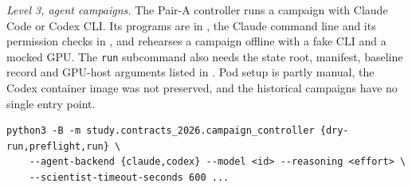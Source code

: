 \emph{Level 3, agent campaigns.} The Pair-A controller runs a campaign with Claude Code or Codex CLI. Its programs are in , the Claude command line and its permission checks in , and  rehearses a campaign offline with a fake CLI and a mocked GPU. The \texttt{run} subcommand also needs the state root, manifest, baseline record and GPU-host arguments listed in . Pod setup is partly manual, the Codex container image was not preserved, and the historical campaigns have no single entry point.
\begingroup\footnotesize
\begin{verbatim}
python3 -B -m study.contracts_2026.campaign_controller {dry-run,preflight,run} \
    --agent-backend {claude,codex} --model <id> --reasoning <effort> \
    --scientist-timeout-seconds 600 ...
\end{verbatim}
\endgroup
